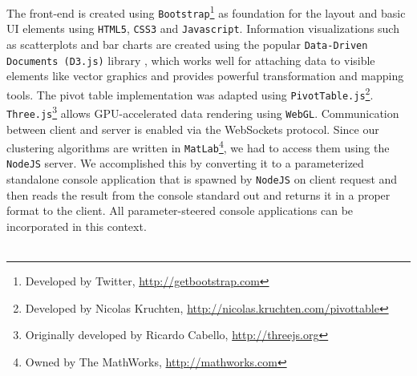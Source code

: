 \documentclass[journal]{style/vgtc} 			          %
\begin{document}
The front-end is created using \texttt{Bootstrap}\footnote{Developed by Twitter, \url{http://getbootstrap.com}} as foundation for the layout and basic UI elements using \texttt{HTML5}, \texttt{CSS3} and \texttt{Javascript}.
%
Information visualizations such as scatterplots and bar charts are created using the popular \texttt{Data-Driven Documents (D3.js)} library \cite{D3}, which works well for attaching data to visible elements like vector graphics and provides powerful transformation and mapping tools.
%
The pivot table implementation was adapted using \texttt{PivotTable.js}\footnote{Developed by Nicolas Kruchten, \url{http://nicolas.kruchten.com/pivottable}}.
%
\texttt{Three.js}\footnote{Originally developed by Ricardo Cabello, \url{http://threejs.org}} allows GPU-accelerated data rendering using \texttt{WebGL}.
%
Communication between client and server is enabled via the WebSockets protocol.
%
Since our clustering algorithms are written in \texttt{MatLab}\footnote{Owned by The MathWorks, \url{http://mathworks.com}}, we had to access them using the \texttt{NodeJS} server.
%
We accomplished this by converting it to a parameterized standalone console application that is spawned by \texttt{NodeJS} on client request and then reads the result from the console standard out and returns it in a proper format to the client.
%
All parameter-steered console applications can be incorporated in this context.
\\\\
\end{document}
